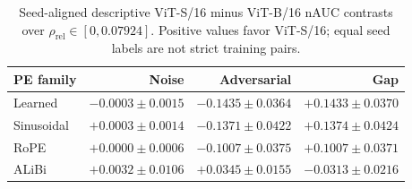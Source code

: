 \begin{table}[t]
\centering
\small
\caption{Seed-aligned descriptive ViT-S/16 minus ViT-B/16 nAUC contrasts over $\rho_{\mathrm{rel}}\in[0,0.07924]$. Positive values favor ViT-S/16; equal seed labels are not strict training pairs.}
\label{tab:v19-architecture-contrasts}
\begin{tabular}{lrrr}
\toprule
PE family & Noise & Adversarial & Gap \\
\midrule
Learned & $-0.0003 \pm 0.0015$ & $-0.1435 \pm 0.0364$ & $+0.1433 \pm 0.0370$ \\
Sinusoidal & $+0.0003 \pm 0.0014$ & $-0.1371 \pm 0.0422$ & $+0.1374 \pm 0.0424$ \\
RoPE & $+0.0000 \pm 0.0006$ & $-0.1007 \pm 0.0375$ & $+0.1007 \pm 0.0371$ \\
ALiBi & $+0.0032 \pm 0.0106$ & $+0.0345 \pm 0.0155$ & $-0.0313 \pm 0.0216$ \\
\bottomrule
\end{tabular}
\end{table}
